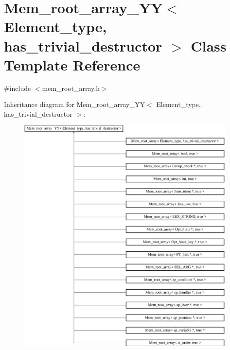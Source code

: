 \hypertarget{classMem__root__array__YY}{}\section{Mem\+\_\+root\+\_\+array\+\_\+\+YY$<$ Element\+\_\+type, has\+\_\+trivial\+\_\+destructor $>$ Class Template Reference}
\label{classMem__root__array__YY}


{\ttfamily \#include $<$mem\+\_\+root\+\_\+array.\+h$>$}

Inheritance diagram for Mem\+\_\+root\+\_\+array\+\_\+\+YY$<$ Element\+\_\+type, has\+\_\+trivial\+\_\+destructor $>$\+:\begin{figure}[H]
\begin{center}
\leavevmode
\includegraphics[height=12.000000cm]{classMem__root__array__YY}
\end{center}
\end{figure}
